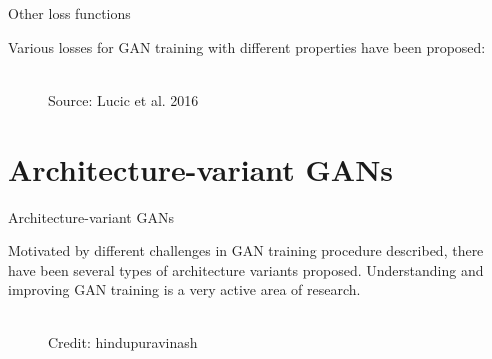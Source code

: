 \begin{frame} {Other loss functions}

Various losses for GAN training with different properties have been proposed:

  \vspace{10mm}
  \begin{figure}
    \centering
      \tiny{\\Source: Lucic et al. 2016}
  \end{figure}
\end{frame}


\section{Architecture-variant GANs}

\begin{frame} {Architecture-variant GANs}

\vspace{2mm}
Motivated by different challenges in GAN training procedure described, there have been several types of architecture variants proposed.
\vspace{2mm}
Understanding and improving GAN training is a very active area of research.

  \begin{figure}
    \centering
      \tiny{\\Credit: hindupuravinash}
  \end{figure}
  \end{frame}
 
